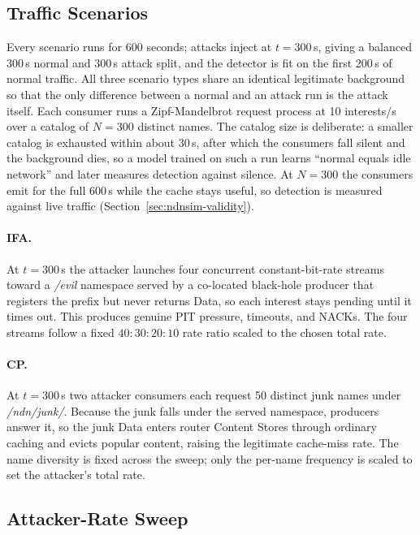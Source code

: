 \documentclass[12pt]{report}
\begin{document}
\subsection{Traffic Scenarios}
Every scenario runs for 600 seconds; attacks inject at $t = 300$\,s, giving a balanced 300\,s normal and 300\,s attack split, and the detector is fit on the first 200\,s of normal traffic. All three scenario types share an identical legitimate background so that the only difference between a normal and an attack run is the attack itself. Each consumer runs a Zipf-Mandelbrot request process at 10 interests/s over a catalog of $N = 300$ distinct names. The catalog size is deliberate: a smaller catalog is exhausted within about 30\,s, after which the consumers fall silent and the background dies, so a model trained on such a run learns ``normal equals idle network'' and later measures detection against silence. At $N = 300$ the consumers emit for the full 600\,s while the cache stays useful, so detection is measured against live traffic (Section~\ref{sec:ndnsim-validity}).

\paragraph{IFA.} At $t = 300$\,s the attacker launches four concurrent constant-bit-rate streams toward a \textit{/evil} namespace served by a co-located black-hole producer that registers the prefix but never returns Data, so each interest stays pending until it times out. This produces genuine PIT pressure, timeouts, and NACKs. The four streams follow a fixed $40\!:\!30\!:\!20\!:\!10$ rate ratio scaled to the chosen total rate.

\paragraph{CP.} At $t = 300$\,s two attacker consumers each request 50 distinct junk names under \textit{/ndn/junk/}. Because the junk falls under the served namespace, producers answer it, so the junk Data enters router Content Stores through ordinary caching and evicts popular content, raising the legitimate cache-miss rate. The name diversity is fixed across the sweep; only the per-name frequency is scaled to set the attacker's total rate.

\subsection{Attacker-Rate Sweep}
\label{sec:sweep}
\end{document}
